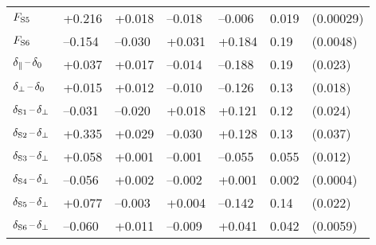 \begin{table}[htbp]
\begin{tabular}{lllllll}
    $\FS[5]$        &   +0.216    &   +0.018  &  --0.018  &  --0.006  &  0.019  &  (0.00029)                    \\
    $\FS[6]$        &  --0.154    &  --0.030  &   +0.031  &   +0.184  &  0.19   &  (0.0048)                     \\
    \hline
    $\delparzero$   &   +0.037    &   +0.017  &  --0.014  &  --0.188  &  0.19   &  (0.023)                      \\
    $\delperpzero$  &   +0.015    &   +0.012  &  --0.010  &  --0.126  &  0.13   &  (0.018)                      \\
    $\delSperp[1]$  &  --0.031    &  --0.020  &   +0.018  &   +0.121  &  0.12   &  (0.024)                      \\
    $\delSperp[2]$  &   +0.335    &   +0.029  &  --0.030  &   +0.128  &  0.13   &  (0.037)                      \\
    $\delSperp[3]$  &   +0.058    &   +0.001  &  --0.001  &  --0.055  &  0.055  &  (0.012)                      \\
    $\delSperp[4]$  &  --0.056    &   +0.002  &  --0.002  &   +0.001  &  0.002  &  (0.0004)                     \\
    $\delSperp[5]$  &   +0.077    &  --0.003  &   +0.004  &  --0.142  &  0.14   &  (0.022)                      \\
    $\delSperp[6]$  &  --0.060    &   +0.011  &  --0.009  &   +0.041  &  0.042  &  (0.0059)                     \\
    \hline
  \end{tabular}
\end{table}


